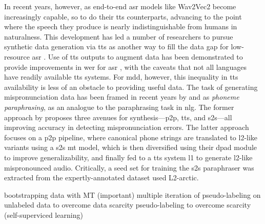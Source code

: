 \documentclass[thesis]{cluu}
\begin{document}
In recent years, however, as end-to-end \gls{asr} models like Wav2Vec2 become increasingly capable, so to do their \gls{tts} counterparts, advancing to the point where the speech they produce is nearly indistinguishable from humans in naturalness. This development has led a number of researchers to pursue synthetic data generation via \gls{tts} as another way to fill the data gap for low-resource \gls{asr} \parencite[see][inter alia]{barteldsMakingMoreLittle2023,thaiSyntheticDataAugmentation2019,fazelSynthASRUnlockingSynthetic2021}. Use of \gls{tts} outputs to augment data has been demonstrated to provide improvements in \gls{wer} for \gls{asr} \parencite{barteldsMakingMoreLittle2023}, with the caveats that not all languages have readily available \gls{tts} systems. For \gls{mdd}, however, this inequality in \gls{tts} availability is less of an obstacle to providing useful data. The task of generating mispronunciation data has been framed in recent years by \textcite{korzekwaComputerassistedPronunciationTraining2022} and \textcite{zhangL2GENNeuralPhoneme2022} as \textit{phoneme paraphrasing}, as an analogue to the paraphrasing task in \gls{nlg}. The former approach by \textcite{korzekwaComputerassistedPronunciationTraining2022} proposes three avenues for synthesis---\gls{p2p}, \gls{tts}, and \gls{s2s}---all improving accuracy in detecting mispronunciation errors. The latter approach focuses on a \gls{p2p} pipeline, where canonical phone strings are translated to \gls{l2}-like variants using a \gls{s2s} \gls{mt} model, which is then diversified using their \gls{dpad} module to improve generalizability, and finally fed to a \gls{tts} system \gls{l1} to generate \gls{l2}-like mispronounced audio. Critically, a seed set for training the \gls{s2s} paraphraser was extracted from the expertly-annotated dataset used L2-arctic.

\textcite{punjabiLanguageModelBootstrapping2019} bootstrapping data with MT (important)
\textcite{xuIterativePseudoLabelingSpeech2020} multiple iteration of pseudo-labeling on unlabeled data to overcome data scarcity
\textcite{yangImprovingMispronunciationDetection2022} pseudo-labeling to overcome scarcity (self-superviced learning)
\end{document}
